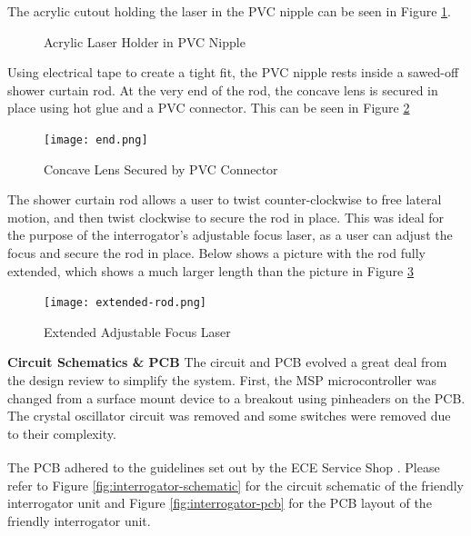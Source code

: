\documentclass[letterpaper,10pt]{article}
\begin{document}
\begin{spacing}{1.15}
The acrylic cutout holding the laser in the PVC nipple can be seen in Figure \ref{fig:acrylic}.

	\begin{figure}%
		\centering
		\qquad
		\caption{Acrylic Laser Holder in PVC Nipple}%
		\label{fig:acrylic}%
	\end{figure}
	
Using electrical tape to create a tight fit, the PVC nipple rests inside a sawed-off shower curtain rod. At the very end of the rod, the concave lens is secured in place using hot glue and a PVC connector. This can be seen in Figure \ref{fig:end}

\begin{figure} [H]
	\centering
	\texttt{[image: end.png]}
	\label{fig:end}
	\caption{Concave Lens Secured by PVC Connector}
\end{figure}

The shower curtain rod allows a user to twist counter-clockwise to free lateral motion, and then twist clockwise to secure the rod in place. This was ideal for the purpose of the interrogator's adjustable focus laser, as a user can adjust the focus and secure the rod in place. Below shows a picture with the rod fully extended, which shows a much larger length than the picture in Figure \ref{fig:extended}

\begin{figure} [H]
	\centering
	\texttt{[image: extended-rod.png]}
	\label{fig:extended}
	\caption{Extended Adjustable Focus Laser}
\end{figure}

\hspace{5mm}\textbf{Circuit Schematics \& PCB} \label{section:interrogator-circuit-schematics-design-details}
The circuit and PCB evolved a great deal from the design review to simplify the system. First, the MSP microcontroller was changed from a surface mount device to a breakout using pinheaders on the PCB. The crystal oscillator circuit was removed and some switches were removed due to their complexity.

The PCB adhered to the guidelines set out by the ECE Service Shop \textsuperscript{\cite{ECE-Electronics-Shop}}.
Please refer to Figure \ref{fig:interrogator-schematic} for the circuit schematic of the friendly interrogator unit and Figure \ref{fig:interrogator-pcb} for the PCB layout of the friendly interrogator unit. 




\end{spacing}
\end{document}
